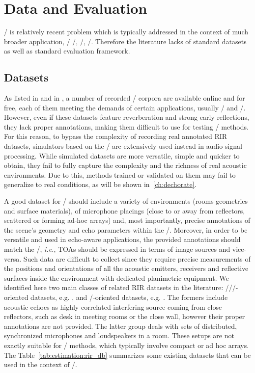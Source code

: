\section{Data and Evaluation}\label{sec:estimation:datametrics}
\AER/ is relatively recent problem which is typically addressed in the context of much broader application, \eg/ \SE/, \RooGE/, \SSL/.
Therefore the literature lacks of standard datasets as well as standard evaluation framework.

\subsection{Datasets}
As listed in  and in , a number of recorded \RIRs/ corpora are available online and for free, each of them meeting the demands of certain applications, usually \SE/ and \ASR/.
However, even if these datasets feature reverberation and strong early reflections, they lack proper annotations, making them difficult to use for testing \AER/ methods.
For this reason, to bypass the complexity of recording real annotated RIR datasets, simulators based on the \ISM/ are extensively used instead in audio signal processing.
While simulated datasets are more versatile, simple and quicker to obtain, they fail to fully capture the complexity and the richness of real acoustic environments.
Due to this, methods trained or validated on them may fail to generalize to real conditions, as will be shown in~\cref{ch:dechorate}.

\mynewline
A good dataset for \AER/ should include a variety of environments (rooms geometries and surface materials), of microphone placings (close to or away from reflectors, scattered or forming ad-hoc arrays) and, most importantly, precise annotations of the scene's geometry and echo parameters within the \RIRs/.
Moreover, in order to be versatile and used in echo-aware applications, the provided annotations should match the \ISM/, \textit{i.e.}, TOAs should be expressed in terms of image sources and vice-versa.
Such data are difficult to collect since they require precise measurements of the positions and orientations of all the acoustic emitters, receivers and reflective surfaces inside the environment with dedicated planimetric equipment.
We identified here two main classes of related RIR datasets in the literature:
\SE//\ASR/-oriented datasets, e.g. , and \RooGE/-oriented datasets, e.g. .
The formers include acoustic echoes as highly correlated interfering source coming from close reflectors, such as desk in meeting rooms or the close wall, however their proper annotations are not provided.
The latter group deals with sets of distributed, synchronized microphones and loudspeakers in a room.
These setups are not exactly suitable for \SE/ methods, which typically involve compact or ad hoc arrays.
The Table~\ref{tab:estimation:rir_db} summarizes some existing datasets that can be used in the context of \AER/.


